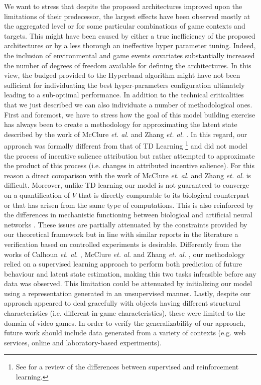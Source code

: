 We want to stress that despite the proposed architectures improved upon the limitations of their predecessor, the largest effects have been observed mostly at the aggregated level or for some particular combinations of game contexts and targets. This might have been caused by either a true inefficiency of the proposed architectures or by a less thorough an ineffective hyper parameter tuning. Indeed, the inclusion of environmental and game events covariates substantially increased the number of degrees of freedom available for defining the architectures. In this view, the budged provided to the Hyperband algorithm might have not been sufficient for individuating the best hyper-parameters configuration ultimately leading to a sub-optimal performance. In addition to the technical criticalities that we just described we can also individuate a number of methodological ones. First and foremost, we have to stress how the goal of this model building exercise has always been to create a methodology for approximating the latent state described by the work of McClure \textit{et. al.} \cite{mcclure2003computational} and Zhang \textit{et. al.} \cite{zhang2009neural}. In this regard, our approach was formally different from that of TD Learning \footnote{See \cite{barto2004reinforcement} for a  review of the differences between supervised and reinforcement learning.} and did not model the process of incentive salience attribution but rather attempted to approximate the product of this process (i.e. changes in attributed incentive salience). For this reason a direct comparison with the work of McClure \textit{et. al.} \cite{mcclure2003computational} and Zhang \textit{et. al.} \cite{zhang2009neural} is difficult. Moreover, unlike TD learning \cite{schultz1997neural} our model is not guaranteed to converge on a quantification of $V$ that is directly comparable to its biological counterpart or that has arisen from the same type of computations. This is also reinforced by the differences in mechanistic functioning between biological and artificial neural networks \cite{lillicrap2019backpropagation,lillicrap2020backpropagation}. These issues are partially attenuated by the constraints provided by our theoretical framework but in line with similar reports in the literature \cite{calhoun2019unsupervised,wang2018prefrontal} a verification based on controlled experiments is desirable. Differently from the works of Calhoun \textit{et. al.} \cite{calhoun2019unsupervised},  McClure \textit{et. al.} \cite{mcclure2003computational} and Zhang \textit{et. al.} \cite{zhang2009neural}, our methodology relied on a  supervised learning approach to perform both prediction of future behaviour and latent state estimation, making this two tasks infeasible before any data was observed. This limitation could be attenuated by initializing our model using a representation  generated in an unsupervised manner. Lastly, despite our approach appeared to deal gracefully  with objects having different structural characteristics (i.e. different in-game characteristics), these were limited to the domain of video games. In order to verify the generalizability of our approach, future work should include data generated from a variety of contexts (e.g. web services, online and laboratory-based experiments).

